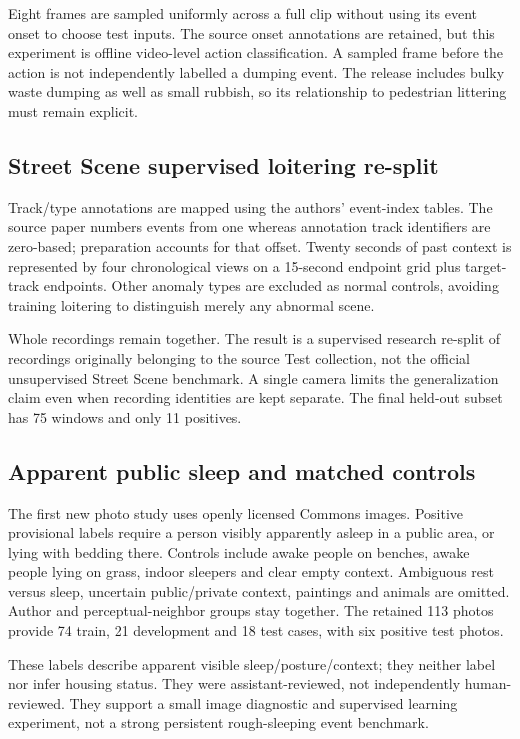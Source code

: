 Eight frames are sampled uniformly across a full clip without using its event onset to choose test inputs. The source onset annotations are retained, but this experiment is offline video-level action classification. A sampled frame before the action is not independently labelled a dumping event. The release includes bulky waste dumping as well as small rubbish, so its relationship to pedestrian littering must remain explicit.

\subsection{Street Scene supervised loitering re-split}
Track/type annotations are mapped using the authors' event-index tables. The source paper numbers events from one whereas annotation track identifiers are zero-based; preparation accounts for that offset. Twenty seconds of past context is represented by four chronological views on a 15-second endpoint grid plus target-track endpoints. Other anomaly types are excluded as normal controls, avoiding training loitering to distinguish merely any abnormal scene.

Whole recordings remain together. The result is a supervised research re-split of recordings originally belonging to the source Test collection, not the official unsupervised Street Scene benchmark. A single camera limits the generalization claim even when recording identities are kept separate. The final held-out subset has 75 windows and only 11 positives.

\subsection{Apparent public sleep and matched controls}
The first new photo study uses openly licensed Commons images. Positive provisional labels require a person visibly apparently asleep in a public area, or lying with bedding there. Controls include awake people on benches, awake people lying on grass, indoor sleepers and clear empty context. Ambiguous rest versus sleep, uncertain public/private context, paintings and animals are omitted. Author and perceptual-neighbor groups stay together. The retained 113 photos provide 74 train, 21 development and 18 test cases, with six positive test photos.

These labels describe apparent visible sleep/posture/context; they neither label nor infer housing status. They were assistant-reviewed, not independently human-reviewed. They support a small image diagnostic and supervised learning experiment, not a strong persistent rough-sleeping event benchmark.



